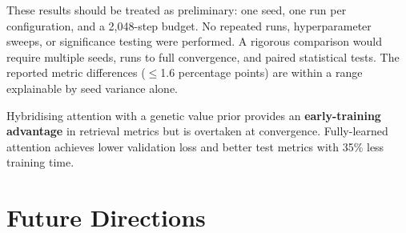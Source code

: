 \documentclass[10pt, a4paper, twocolumn]{article}
\begin{document}
These results should be treated as preliminary: one seed, one run per configuration, and a 2,048-step budget. No repeated runs, hyperparameter sweeps, or significance testing were performed. A rigorous comparison would require multiple seeds, runs to full convergence, and paired statistical tests. The reported metric differences ($\leq$1.6 percentage points) are within a range explainable by seed variance alone.

\begin{tcolorbox}[resultbox]
  \small Hybridising attention with a genetic value prior provides an \textbf{early-training advantage} in retrieval metrics but is overtaken at convergence. Fully-learned attention achieves lower validation loss and better test metrics with 35\% less training time.
\end{tcolorbox}

\section{Future Directions}
\label{sec:future}
\end{document}
